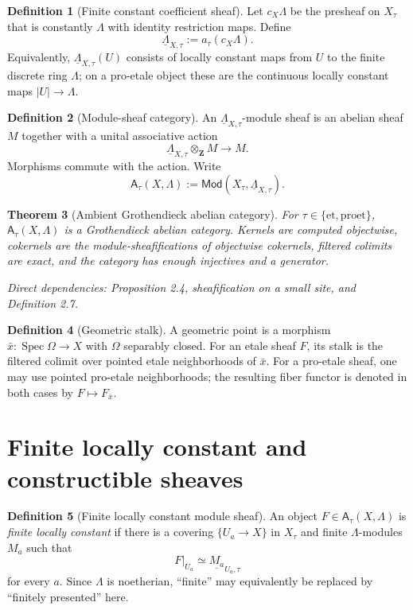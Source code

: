 \documentclass[10pt]{article}
\newtheorem{theorem}{Theorem}[section]
\theoremstyle{definition}
\newtheorem{definition}[theorem]{Definition}
\newcommand{\Lam}{\Lambda}
\newcommand{\Mod}{\mathsf{Mod}}
\newcommand{\et}{\mathrm{et}}
\newcommand{\proet}{\mathrm{proet}}
\newcommand{\dep}[1]{\par\smallskip\noindent\textit{Direct dependencies: #1}}
\begin{document}
\begin{definition}[Finite constant coefficient sheaf]
Let $c_X\Lam$ be the presheaf on $X_\tau$ that is constantly $\Lam$ with
identity restriction maps.  Define
\[
\underline\Lam_{X,\tau}:=a_\tau(c_X\Lam).
\]
Equivalently, $\underline\Lam_{X,\tau}(U)$ consists of locally constant maps
from $U$ to the finite discrete ring $\Lam$; on a pro-etale object these are
the continuous locally constant maps $|U|\to\Lam$.
\end{definition}

\begin{definition}[Module-sheaf category]
An $\underline\Lam_{X,\tau}$-module sheaf is an abelian sheaf $M$ together
with a unital associative action
\[
\underline\Lam_{X,\tau}\otimes_{\mathbf Z}M\longrightarrow M.
\]
Morphisms commute with the action.  Write
\[
\mathsf A_\tau(X,\Lam)
:=\Mod(X_\tau,\underline\Lam_{X,\tau}).
\]
\end{definition}

\begin{theorem}[Ambient Grothendieck abelian category]
For $\tau\in\{\et,\proet\}$, $\mathsf A_\tau(X,\Lam)$ is a Grothendieck
abelian category.  Kernels are computed objectwise, cokernels are the
module-sheafifications of objectwise cokernels, filtered colimits are exact,
and the category has enough injectives and a generator.
\dep{Proposition 2.4, sheafification on a small site, and Definition 2.7.}
\end{theorem}

\begin{definition}[Geometric stalk]
A geometric point is a morphism $\bar x:\operatorname{Spec}\Omega\to X$ with
$\Omega$ separably closed.  For an etale sheaf $F$, its stalk is the filtered
colimit over pointed etale neighborhoods of $\bar x$.  For a pro-etale sheaf,
one may use pointed pro-etale neighborhoods; the resulting fiber functor is
denoted in both cases by $F\mapsto F_{\bar x}$.
\end{definition}

\section{Finite locally constant and constructible sheaves}

\begin{definition}[Finite locally constant module sheaf]
An object $F\in\mathsf A_\tau(X,\Lam)$ is \emph{finite locally constant} if
there is a covering $\{U_a\to X\}$ in $X_\tau$ and finite $\Lam$-modules
$M_a$ such that
\[
F|_{U_a}\simeq\underline{M_a}_{U_a,\tau}
\]
for every $a$.  Since $\Lam$ is noetherian, ``finite'' may equivalently be
replaced by ``finitely presented'' here.
\end{definition}
\end{document}
